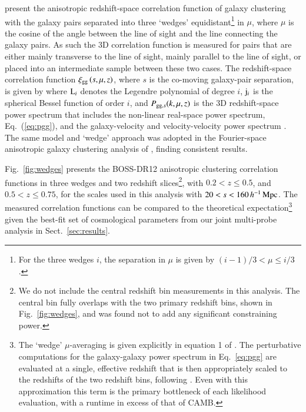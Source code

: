 \citet{sanchez/etal:2017} present the anisotropic redshift-space correlation function of galaxy clustering with the galaxy pairs separated into three `wedges' equidistant\footnote{For the three wedges $i$, the separation in $\mu$ is given by $(i-1)/3 < \mu \leq i/3$.} in $\mu$, where $\mu$ is the cosine of the angle between the line of sight and the line connecting the galaxy pairs.   As such the 3D correlation function is measured for pairs that are either mainly transverse to the line of sight, mainly parallel to the line of sight, or placed into an intermediate sample between these two cases.  The redshift-space correlation function $\xi_{\rm gg} \left( s,\mu,z \right)$, where $s$ is the co-moving galaxy-pair separation, is given by
where ${\rm L}_i$ denotes the Legendre polynomial of degree $i$, ${\rm j}_i$ is the spherical Bessel function of order $i$, and $P_{{\rm gg}, s}(k,\mu,z)$ is the 3D redshift-space power spectrum that includes the non-linear real-space power spectrum, Eq.~(\ref{eq:pgg}), and the galaxy-velocity and velocity-velocity power spectrum \citep[see][for details, including how the Alcock-Paczynski distortions are accounted for in the modelling]{sanchez/etal:2017}.     The same model and `wedge' approach was adopted in the Fourier-space anisotropic galaxy clustering analysis of \citet{grieb/etal:2017}, finding consistent results.

Fig.~\ref{fig:wedges} presents the \citet{sanchez/etal:2017} BOSS-DR12 anisotropic clustering correlation functions in three wedges and two redshift slices\footnote{We do not include the \citet{sanchez/etal:2017} central redshift bin measurements in this analysis.  The central bin fully overlaps with the two primary redshift bins, shown in Fig.~\ref{fig:wedges}, and was found not to add any significant constraining power.}, with $0.2<z\leq0.5$, and $0.5<z\leq0.75$, for the scales used in this analysis with $20  < s < 160\, h^{-1}\, {\rm Mpc}$.   The measured correlation functions can be compared to the theoretical expectation\footnote{The `wedge' $\mu$-averaging is given explicitly in equation 1 of \citet{sanchez/etal:2017}.   The perturbative computations for the galaxy-galaxy power spectrum in Eq.~\ref{eq:pgg} are evaluated at a single, effective redshift that is then appropriately scaled to the redshifts of the two redshift bins, following \citet{sanchez/etal:2017}.  Even with this approximation this term is the primary bottleneck of each likelihood evaluation, with a runtime in excess of that of {\sc CAMB}.}  given the best-fit set of cosmological parameters from our joint multi-probe analysis in Sect.~\ref{sec:results}.

